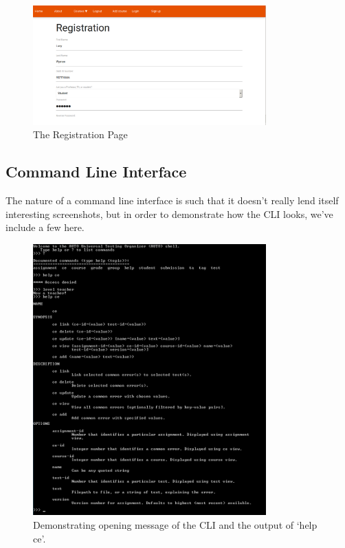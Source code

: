 \documentclass[10pt,draftclsnofoot,onecolumn]{IEEEtran}
\begin{document}
\begin{figure}[h]
\centering
\includegraphics[width=0.8\textwidth]{register}
\caption{The Registration Page}
\end{figure}

\subsection{Command Line Interface}
The nature of a command line interface is such that it doesn’t really lend
itself interesting screenshots, but in order to demonstrate how the CLI looks,
we’ve include a few here.

\begin{figure}[h]
\centering
\includegraphics[width=0.8\textwidth]{senior-project-screenshot-CLI-help-ce}
\caption{Demonstrating opening message of the CLI and the output of ‘help ce’.}
\end{figure}
\end{document}
